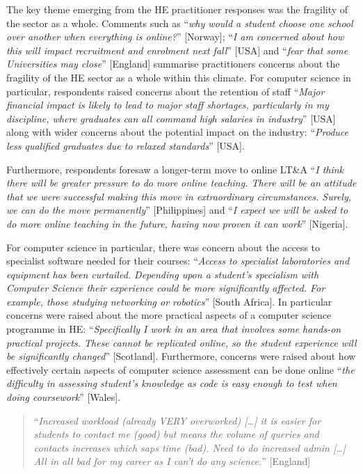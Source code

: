 \documentclass[conference]{IEEEtran}
\begin{document}
The key theme emerging from the HE practitioner responses was the
fragility of the sector as a whole. Comments such as ``{\emph{why
would a student choose one school over another when everything is
online?}}'' [Norway]; ``{\emph{I am concerned about how this will
impact recruitment and enrolment next fall}}'' [USA] and ``{\emph{fear
that some Universities may close}}'' [England] summarise practitioners
concerns about the fragility of the HE sector as a whole within this
climate. For computer science in particular, respondents raised
concerns about the retention of staff ``{\emph{Major financial impact
is likely to lead to major staff shortages, particularly in my
discipline, where graduates can all command high salaries in
industry}}'' [USA] along with wider concerns about the potential
impact on the industry: ``{\emph{Produce less qualified graduates due
    to relaxed standards}}'' [USA].

Furthermore, respondents foresaw a longer-term move to online LT\&A
``{\emph{I think there will be greater pressure to do more online
teaching. There will be an attitude that we were successful making
this move in extraordinary circumstances. Surely, we can do the move
permanently}}'' [Philippines] and ``{\emph{I expect we will be asked
to do more online teaching in the future, having now proven it can
work}}'' [Nigeria].

For computer science in particular, there was concern about the access
to specialist software needed for their courses: ``{\emph{Access to
specialist laboratories and equipment has been curtailed. Depending
upon a student’s specialism with Computer Science their experience
could be more significantly affected. For example, those studying
networking or robotics}}'' [South Africa]. In particular concerns were
raised about the more practical aspects of a computer science
programme in HE: ``{\emph{Specifically I work in an area that involves
some hands-on practical projects. These cannot be replicated online,
so the student experience will be significantly changed}}''
[Scotland]. Furthermore, concerns were raised about how effectively certain
aspects of computer science assessment can be done online ``{\emph{the
difficulty in assessing student's knowledge as code is easy enough to
test when doing coursework}}'' [Wales].

\begin{quotation}
``{\emph{Increased workload (already VERY overworked) […]  it is
easier for students to contact me (good) but means the volume of
queries and contacts increases which saps time (bad). Need to do
increased admin […] All in all bad for my career as I can’t do any
science.}}'' [England]
\end{quotation}
\end{document}
